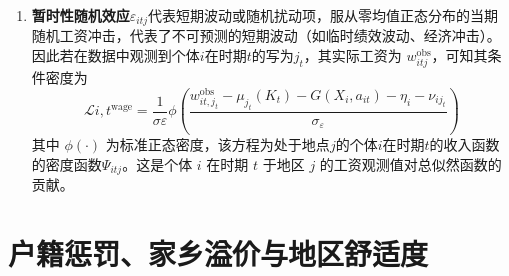 \documentclass[master, final]{zufe-thesis}
\begin{document}
\begin{enumerate}
  \item \textbf{暂时性随机效应}$\varepsilon_{itj}$代表短期波动或随机扰动项，服从零均值正态分布的当期随机工资冲击，代表了不可预测的短期波动（如临时绩效波动、经济冲击）。
  因此若在数据中观测到个体$i$在时期$t$的写为$j_t$，其实际工资为 $w_{itj}^{\mathrm{obs}}$，可知其条件密度为
  \begin{equation}
  \mathcal{L}{i,t}^{\text{wage}} = \frac{1}{\sigma\varepsilon}\phi\left(\frac{w_{it,j_t}^{\mathrm{obs}}-\mu_{j_t}(K_t)-G(X_i,a_{it})-\eta_i-\nu_{ij_t}}{\sigma_\varepsilon}\right)
  \label{eq:工资自然贡献}
  \end{equation}
  其中 $\phi(\cdot)$ 为标准正态密度，该方程为处于地点$j$的个体$i$在时期$t$的收入函数的密度函数$\Psi_{itj}$。这是个体 $i$ 在时期 $t$ 于地区 $j$ 的工资观测值对总似然函数的贡献。
\end{enumerate}



\section{户籍惩罚、家乡溢价与地区舒适度}
\end{document}

